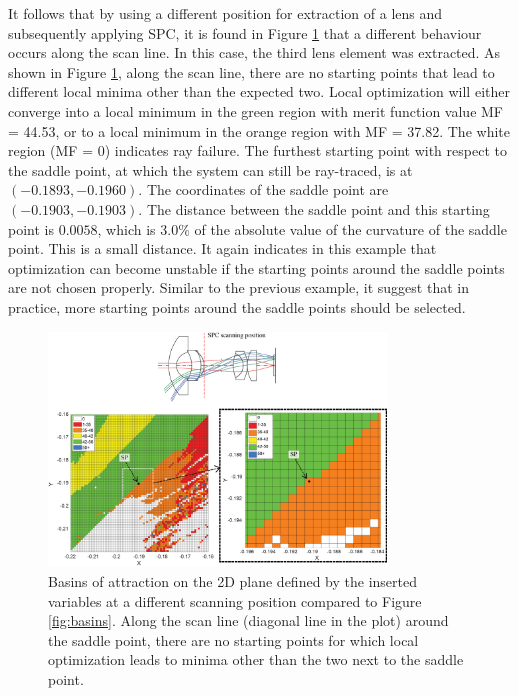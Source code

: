 It follows that by using a different position for extraction of a lens and subsequently applying SPC, it is found in Figure \ref{fig:basins_WAL_M3_S5} that a different behaviour occurs along the scan line. In this case, the third lens element was extracted. As shown in Figure \ref{fig:basins_WAL_M3_S5}, along the scan line, there are no starting points that lead to different local minima other than the expected two. Local optimization will either converge into a local minimum in the green region with merit function value MF = 44.53, or to a local minimum in the orange region with MF = 37.82. The white region (MF = 0) indicates ray failure. The furthest starting point with respect to the saddle point, at which the system can still be ray-traced, is at $(-0.1893, -0.1960)$. The coordinates of the saddle point are $(-0.1903, -0.1903)$. The distance between the saddle point and this starting point is $0.0058$, which is $3.0\%$ of the absolute value of the curvature of the saddle point. This is a small distance. It again indicates in this example that optimization can become unstable if the starting points around the saddle points are not chosen properly. Similar to the previous example, it suggest that in practice, more starting points around the saddle points should be selected. 
\begin{figure}[h!]
    \centering
    \includegraphics[width=0.8\textwidth]{chapter-4/figures/M3-S5_basins.png}
    \caption{Basins of attraction on the 2D plane defined by the inserted variables at a different scanning position compared to Figure \ref{fig:basins}. Along the scan line (diagonal line in the plot) around the saddle point, there are no starting points for which local optimization leads to minima other than the two next to the saddle point.}
    \label{fig:basins_WAL_M3_S5}
\end{figure}
